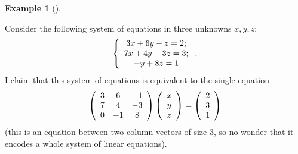 \documentclass[numbers=enddot,12pt,final,onecolumn,notitlepage]{scrartcl}%
\theoremstyle{definition}
\newtheorem{exam}[theo]{Example}
\newenvironment{example}[1][]
{\begin{exam}[#1]\begin{leftbar}}
{\end{leftbar}\end{exam}}
\begin{document}
\begin{example}
\label{exam.systems}Consider the following system of equations in three
unknowns $x,y,z$:%
\begin{equation}
\left\{
\begin{array}
[c]{c}%
3x+6y-z=2;\\
7x+4y-3z=3;\\
-y+8z=1
\end{array}
\right.  . \label{eq.exam.systems.1}%
\end{equation}
I claim that this system of equations is equivalent to the single equation%
\begin{equation}
\left(
\begin{array}
[c]{ccc}%
3 & 6 & -1\\
7 & 4 & -3\\
0 & -1 & 8
\end{array}
\right)  \left(
\begin{array}
[c]{c}%
x\\
y\\
z
\end{array}
\right)  =\left(
\begin{array}
[c]{c}%
2\\
3\\
1
\end{array}
\right)  \label{eq.exam.systems.2}%
\end{equation}
(this is an equation between two column vectors of size $3$, so no wonder that
it encodes a whole system of linear equations).


\end{example}
\end{document}
